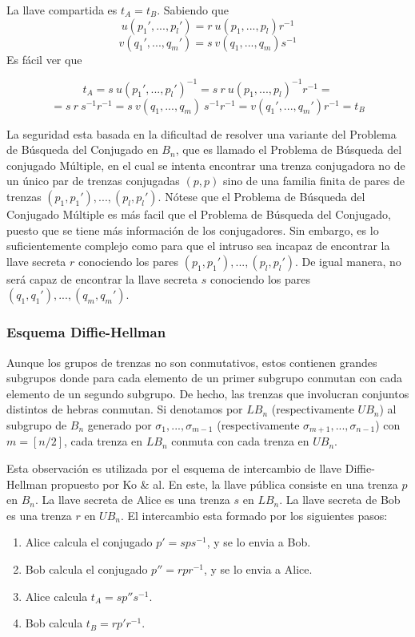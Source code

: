 \documentclass[12pt]{article}
\theoremstyle{definition}
\begin{document}
La llave compartida es $t_A = t_B$. Sabiendo que 
$$u(p_1',...,p_l')=r\ u(p_1,...,p_l)r^{-1}$$
$$v(q_1',...,q_m')=s\ v(q_1,...,q_m)s^{-1}$$
Es fácil ver que

$$t_A = s\ u(p_1',...,p_l')^{-1} = s\ r\ u(p_1,...,p_l)^{-1}r^{-1}=$$
$$=s\ r\ s^{-1}r^{-1}= s\ v(q_1,...,q_m)\ s^{-1}r^{-1}=v(q_1',...,q_m')r^{-1} = t_B$$

La seguridad esta basada en la dificultad de resolver una variante del Problema de Búsqueda del Conjugado en $B_n$, que es llamado el Problema de Búsqueda del conjugado Múltiple, en el cual se intenta encontrar una trenza conjugadora no de un único par de trenzas conjugadas $(p,p)$ sino de una familia finita de pares de trenzas $(p_1,p_1'),...,(p_l,p_l')$. Nótese que el Problema de Búsqueda del Conjugado Múltiple es más facil que el Problema de Búsqueda del Conjugado, puesto que se tiene más información de los conjugadores. Sin embargo, es lo suficientemente complejo como para que el intruso sea incapaz de encontrar la llave secreta $r$ conociendo los pares $(p_1,p_1'),...,(p_l,p_l')$. De igual manera, no será capaz de encontrar la llave secreta $s$ conociendo los pares $(q_1,q_1'),...,(q_m,q_m')$.

\subsubsection{Esquema Diffie-Hellman} Aunque los grupos de trenzas no son conmutativos, estos contienen grandes subgrupos donde para cada elemento de un primer subgrupo conmutan con cada elemento de un segundo subgrupo. De hecho, las trenzas que involucran conjuntos distintos de hebras conmutan. Si denotamos por $LB_n$ (respectivamente $UB_n$) al subgrupo de $B_n$ generado por $\sigma_1,...,\sigma_{m-1}$ (respectivamente $\sigma_{m+1},...,\sigma_{n-1}$) con $m=[n/2]$, cada trenza en $LB_n$ conmuta con cada trenza en $UB_n$.

Esta observación es utilizada por el esquema de intercambio de llave Diffie-Hellman propuesto por Ko \& al. En este, la llave pública consiste en una trenza $p$ en $B_n$. La llave secreta de Alice es una trenza $s$ en $LB_n$. La llave secreta de Bob es una trenza $r$ en $UB_n$. El intercambio esta formado por los siguientes pasos:

\begin{enumerate}
\item Alice calcula el conjugado $p'=sps^{-1}$, y se lo envia a Bob.
\item Bob calcula el conjugado $p''=rpr^{-1}$, y se lo envia a Alice.
\item Alice calcula $t_A = sp''s^{-1}$.
\item Bob calcula $t_B = rp'r^{-1}$. 
\end{enumerate}
\end{document}
